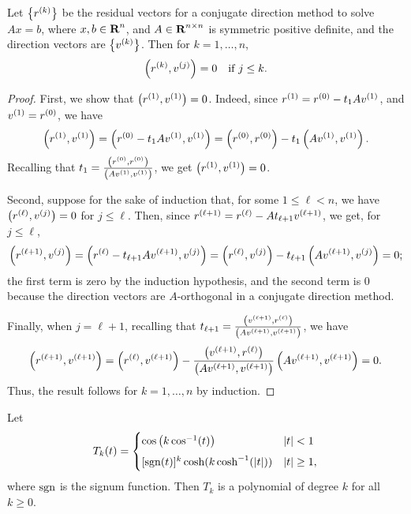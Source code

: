 \documentclass{homework}
\begin{document}
	\question Let $\big\{r^{(k)}\big\}$ be the residual vectors for a conjugate direction method to solve $Ax = b$, where $x, b \in \textbf{R}^n$, and $A \in \textbf{R}^{n\times n}$ is symmetric positive definite, and the direction vectors are $\big\{v^{(k)}\big\}$. Then for $k =1, \dots, n$,
	\begin{equation*}
		\left(r^{(k)}, v^{(j)}\right) = 0 \quad \text{if } j \le k.
	\end{equation*}
	\begin{proof}
		First, we show that $\left(r^{(1)}, v^{(1)}\right) = 0$. Indeed, since $r^{(1)} = r^{(0)} - t_1Av^{(1)}$, and $v^{(1)} = r^{(0)}$, we have
		\begin{equation*}
			\left(r^{(1)}, v^{(1)}\right) = \left(r^{(0)} - t_1Av^{(1)}, v^{(1)}\right) = \left(r^{(0)}, r^{(0)}\right) - t_1\left(Av^{(1)},v^{(1)}\right).
		\end{equation*}
		Recalling that $t_1 = \frac{\left(r^{(0)}, r^{(0)}\right)}{\left(Av^{(1)}, v^{(1)}\right)}$, we get $\left(r^{(1)}, v^{(1)}\right) = 0$.
		
		Second, suppose for the sake of induction that, for some $1 \le \ell < n$, we have $\left(r^{(\ell)}, v^{(j)}\right) = 0$ for $j \le \ell$. Then, since $r^{(\ell+1)} = r^{(\ell)} - At_{\ell+1}v^{(\ell+1)}$, we get, for $j \le \ell$,
		\begin{equation*}
			\left(r^{(\ell+1)}, v^{(j)}\right) = \left(r^{(\ell)} - t_{\ell+1}Av^{(\ell+1)}, v^{(j)}\right) = \left(r^{(\ell)}, v^{(j)}\right) - t_{\ell+1}\left(Av^{(\ell+1)}, v^{(j)}\right) = 0;
		\end{equation*}
		the first term is zero by the induction hypothesis, and the second term is 0 because the direction vectors are $A$-orthogonal in a conjugate direction method.
		
		Finally, when $j = \ell + 1$, recalling that $t_{\ell+1} = \frac{\left(v^{(\ell+1)}, r^{(\ell)}\right)}{\left(Av^{(\ell+1)}, v^{(\ell+1)}\right)}$, we have
		\begin{equation*}
			\left(r^{(\ell+1)}, v^{(\ell+1)}\right) = \left(r^{(\ell)}, v^{(\ell+1)}\right) - \frac{\left(v^{(\ell+1)}, r^{(\ell)}\right)}{\left(Av^{(\ell+1)}, v^{(\ell+1)}\right)}\left(Av^{(\ell+1)}, v^{(\ell+1)}\right) = 0.
		\end{equation*}
		Thus, the result follows for $k=1,\dots, n$ by induction.
	\end{proof}
	
	\question Let
	\begin{equation*}
		T_k(t) = \begin{cases}
			\cos\left(k\cos^{-1}(t)\right) & |t| < 1 \\[0.5em]
			[\operatorname{sgn}(t)]^k\cosh(k\cosh^{-1}(|t|)) & |t| \ge 1,
		\end{cases}
	\end{equation*}
	where $\operatorname{sgn}$ is the signum function. Then $T_k$ is a polynomial of degree $k$ for all $k \ge 0$.
	
\end{document}
